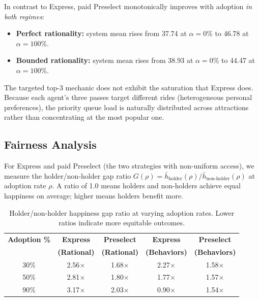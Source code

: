 \documentclass[11pt]{article}
\begin{document}
In contrast to Express, paid Preselect monotonically improves with adoption \emph{in both regimes}:
\begin{itemize}[nosep]
    \item \textbf{Perfect rationality:} system mean rises from 37.74 at $\alpha = 0\%$ to 46.78 at $\alpha = 100\%$.
    \item \textbf{Bounded rationality:} system mean rises from 38.93 at $\alpha = 0\%$ to 44.47 at $\alpha = 100\%$.
\end{itemize}

The targeted top-3 mechanic does not exhibit the saturation that Express does. Because each agent's three passes target different rides (heterogeneous personal preferences), the priority queue load is naturally distributed across attractions rather than concentrating at the most popular one.

\subsection{Fairness Analysis}

For Express and paid Preselect (the two strategies with non-uniform access), we measure the holder/non-holder gap ratio $G(\rho) = \bar{h}_{\text{holder}}(\rho) / \bar{h}_{\text{non-holder}}(\rho)$ at adoption rate $\rho$. A ratio of 1.0 means holders and non-holders achieve equal happiness on average; higher means holders benefit more.

\begin{table}[H]
\centering
\begin{tabular}{ccccc}
\toprule
\textbf{Adoption \%} & \textbf{Express} & \textbf{Preselect} & \textbf{Express} & \textbf{Preselect} \\
& \textbf{(Rational)} & \textbf{(Rational)} & \textbf{(Behaviors)} & \textbf{(Behaviors)} \\
\midrule
30\% & 2.56$\times$ & 1.68$\times$ & 2.27$\times$ & 1.58$\times$ \\
50\% & 2.81$\times$ & 1.80$\times$ & 1.77$\times$ & 1.57$\times$ \\
90\% & 3.17$\times$ & 2.03$\times$ & 0.90$\times$ & 1.54$\times$ \\
\bottomrule
\end{tabular}
\caption{Holder/non-holder happiness gap ratio at varying adoption rates. Lower ratios indicate more equitable outcomes.}
\label{tab:fairness}
\end{table}
\end{document}
